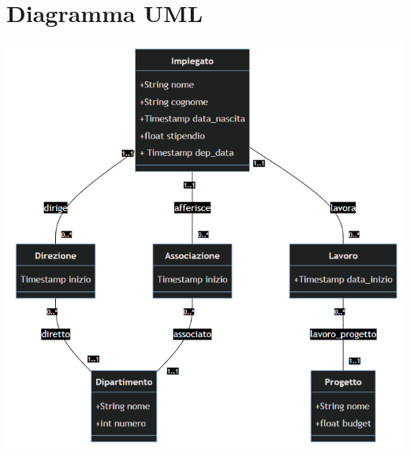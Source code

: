 \documentclass[12pt, letterpaper]{article}
\begin{document}
\section{Diagramma UML}
\begin{center}
    \includegraphics[width=1\textwidth ]{UML_ita2.png}
\end{center}
\end{document}
